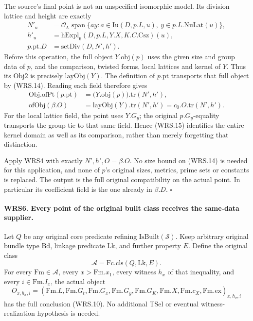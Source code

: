 The source's final point is not an unspecified isomorphic model.
Its division lattice and height are exactly
\[
 \begin{aligned}
 N'_u&=\mathcal O_L\operatorname{span}
       \{a y:a\in\mathrm{Iu}(D,p.L,u),\ y\in p.L.\mathrm{NuLat}(u)\},\\
 h'_u&=\mathrm{hExpl}_6(D,p.L,Y.X,K.C.\mathrm{Csz})(u),\\
 p.\mathrm{pt}.D&=\mathrm{setDiv}(D,N',h').
 \end{aligned}                                                    \tag{WRS.14}
\]
Before this operation, the full object \(Y.\mathrm{obj}(p)\)
uses the given size and group data of \(p\), and the comparison,
twisted forms, local lattices and kernel of \(Y\).
Thus its \(\mathrm{Obj2}\) is precisely \(\mathrm{layObj}(Y)\).
The definition of \(p.\mathrm{pt}\) transports that full object
by (WRS.14).  Reading each field therefore gives
\[
 \begin{aligned}
 \mathrm{Obj.ofPt}(p.\mathrm{pt})
       &=\bigl(Y.\mathrm{obj}(p)\bigr).\mathrm{tr}(N',h'),\\
 \mathrm{ofObj}(\beta.O)
       &=\mathrm{layObj}(Y).\mathrm{tr}(N',h')
        =c_0.O.\mathrm{tr}(N',h').
 \end{aligned}                                                    \tag{WRS.15}
\]
For the local lattice field, the point uses \(Y.G_y\); the
original \(p.G_y\)-equality transports the group tie to that same
field.  Hence (WRS.15) identifies the entire kernel domain as well
as its comparison, rather than merely forgetting that distinction.

Apply WRS4 with exactly \(N',h',O=\beta.O\).
No size bound on (WRS.14) is needed for this application, and none
of \(p\)'s original sizes, metrics, prime sets or constants is
replaced.  The output is the full original compatibility on the
actual point.  In particular its coefficient field is the one
already in \(\beta.D\).
\hfill\(\square\)

\paragraph{WRS6. Every point of the original built class receives the same-data supplier.}
\label{claim:WRS6}
Let \(Q\) be any original core predicate refining
\(\mathrm{IsBuilt}(\mathcal S)\).  Keep arbitrary original bundle
type \(\mathrm{Bd}\), linkage predicate \(\mathrm{Lk}\), and
further property \(E\).  Define the original class
\[
                \mathcal A=\mathrm{Fc.cls}(Q,\mathrm{Lk},E).
 \tag{WRS.16}
\]
For every \(\mathrm{Fm}\in\mathcal A\), every
\(x>\mathrm{Fm}.x_1\), every witness \(h_x\) of that inequality,
and every \(i\in\mathrm{Fm}.I_x\), the actual object
\[
 O_{x,h_x,i}=
 (\mathrm{Fm}.L,\mathrm{Fm}.G_t,\mathrm{Fm}.G_x,
  \mathrm{Fm}.G_y,\mathrm{Fm}.G_K,\mathrm{Fm}.X,
  \mathrm{Fm}.c_X,\mathrm{Fm}.\mathrm{ex})_{x,h_x,i}
 \tag{WRS.17}
\]
has the full conclusion (WRS.10).  No additional \(\mathrm{TSel}\)
or eventual witness-realization hypothesis is needed.

